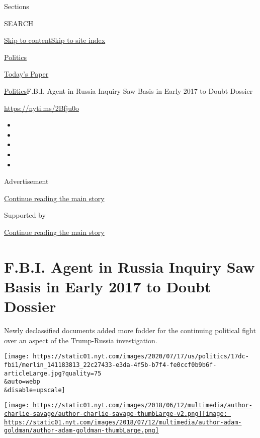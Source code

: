Sections

SEARCH

\protect\hyperlink{site-content}{Skip to
content}\protect\hyperlink{site-index}{Skip to site index}

\href{https://www.nytimes.com/section/politics}{Politics}

\href{https://myaccount.nytimes.com/auth/login?response_type=cookie\&client_id=vi}{}

\href{https://www.nytimes.com/section/todayspaper}{Today's Paper}

\href{/section/politics}{Politics}\textbar{}F.B.I. Agent in Russia
Inquiry Saw Basis in Early 2017 to Doubt Dossier

\url{https://nyti.ms/2Bfju0o}

\begin{itemize}
\item
\item
\item
\item
\item
\end{itemize}

Advertisement

\protect\hyperlink{after-top}{Continue reading the main story}

Supported by

\protect\hyperlink{after-sponsor}{Continue reading the main story}

\hypertarget{fbi-agent-in-russia-inquiry-saw-basis-in-early-2017-to-doubt-dossier}{%
\section{F.B.I. Agent in Russia Inquiry Saw Basis in Early 2017 to Doubt
Dossier}\label{fbi-agent-in-russia-inquiry-saw-basis-in-early-2017-to-doubt-dossier}}

Newly declassified documents added more fodder for the continuing
political fight over an aspect of the Trump-Russia investigation.

\texttt{[image: https://static01.nyt.com/images/2020/07/17/us/politics/17dc-fbi1/merlin\_141183813\_22c27433-e3da-4f5b-b7f4-fe0ccf0b9b6f-articleLarge.jpg?quality=75\\\&auto=webp\\\&disable=upscale]}

\href{https://www.nytimes.com/by/charlie-savage}{\texttt{[image: https://static01.nyt.com/images/2018/06/12/multimedia/author-charlie-savage/author-charlie-savage-thumbLarge-v2.png]}}\href{https://www.nytimes.com/by/adam-goldman}{\texttt{[image: https://static01.nyt.com/images/2018/07/12/multimedia/author-adam-goldman/author-adam-goldman-thumbLarge.png]}}


